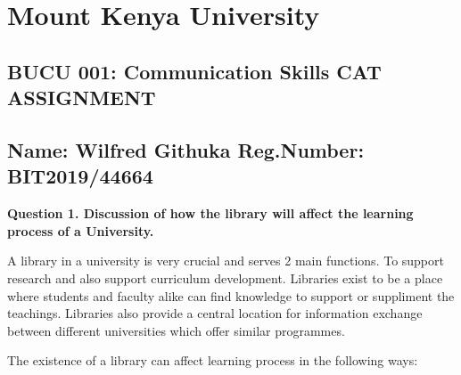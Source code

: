 \documentclass[12pt, a4]{article}
\begin{document}
\section{Mount Kenya University}
\subsection{BUCU 001: Communication Skills CAT ASSIGNMENT}
\subsection{Name: Wilfred Githuka Reg.Number: BIT2019/44664}

\textbf{Question 1. Discussion of  how the library will affect the learning process of a University.}

A library in a university is very crucial and serves 2 main functions. To
support research and also support curriculum development. Libraries exist to be
a place where students and faculty alike can find knowledge to support or
suppliment the teachings. Libraries also provide a central location for
information exchange between different universities which offer similar
programmes.

The existence of a library can affect learning process in the following ways:
\end{document}

